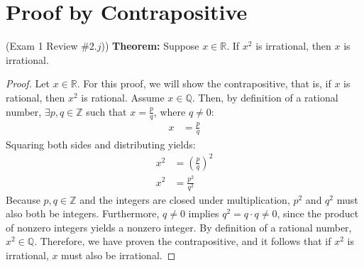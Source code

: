 \documentclass[12pt]{amsart}
\newcommand{\R}{\ensuremath{\mathbb{R}}}
\newcommand{\Z}{\ensuremath{\mathbb{Z}}}
\newcommand{\Q}{\ensuremath{\mathbb{Q}}}
\begin{document}
\section{Proof by Contrapositive}
{(Exam 1 Review $\#2.j$)) }
\textbf{Theorem:}{ Suppose $x \in \R$. If $x^2$ is irrational, then $x$ is irrational.}
\begin{proof}
    Let $x \in \R$. For this proof, we will show the contrapositive, that is, if $x$ is rational, then $x^2$ is rational. Assume $x \in \mathbb{Q}$. Then, by definition of a rational number, $\exists p,q \in \mathbb{Z}$ such that $x = \frac{p}{q}$, where $q \ne 0$:
    \begin{align*}
    x&=\frac{p}{q}
    \end{align*}
    Squaring both sides and distributing yields:
    \begin{align*}
    x^2&=(\frac{p}{q})^2 \\
    x^2&=\frac{p^2}{q^2} 
    \end{align*}
    Because $p,q \in \Z$ and the integers are closed under multiplication, $p^2$ and $q^2$ must also both be integers. Furthermore, $q \ne 0$ implies $q^2 =q \cdot q \ne 0$, since the product of nonzero integers yields a nonzero integer. By definition of a rational number, $x^2 \in \Q$. Therefore, we have proven the contrapositive, and it follows that if $x^2$ is irrational, $x$ must also be irrational.
\end{proof}
\newpage
\end{document}
